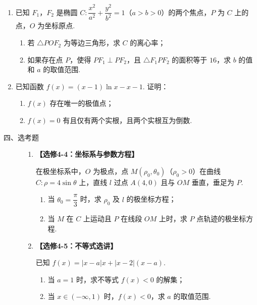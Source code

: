 \begin{description}
\begin{enumerate}[leftmargin=5pt]
附：\(\sqrt{74}\approx 8.602\).

        \item 已知 \(F_1\)，\(F_2\) 是椭圆 \(C:\dfrac{x^2}{a^2}+\dfrac{y^2}{b^2}=1\)（\(a>b>0\)）的两个焦点，\(P\) 为 \(C\) 上的点，\(O\) 为坐标原点.

\begin{enumerate}
\item 若 \(\triangle POF_2\) 为等边三角形，求 \(C\) 的离心率；
\item 如果存在点 \(P\)，使得 \(PF_1\perp PF_2\)，且 \(\triangle F_1PF_2\) 的面积等于 \(16\)，求 \(b\) 的值和 \(a\) 的取值范围.
\end{enumerate}

        \item 已知函数 \(f(x)=(x-1)\ln x-x-1\). 证明：

\begin{enumerate}
\item \(f(x)\) 存在唯一的极值点；
\item \(f(x)=0\) 有且仅有两个实根，且两个实根互为倒数.
\end{enumerate}

    \end{enumerate}

\end{description}

\begin{description}

    \item[四、选考题]

    \begin{enumerate}[leftmargin=5pt]

      \addtocounter{enumi}{+21}

        \item \textbf{【选修4-4：坐标系与参数方程】}

在极坐标系中，\(O\) 为极点，点 \(M(\rho_0,\theta_0)\)（\(\rho_0>0\)）在曲线 \(C:\rho=4\sin\theta\) 上，直线 \(l\) 过点 \(A(4,0)\) 且与 \(OM\) 垂直，垂足为 \(P\).

\begin{enumerate}
\item 当 \(\theta_0=\dfrac{\pi}{3}\) 时，求 \(\rho_0\) 及 \(l\) 的极坐标方程；
\item 当 \(M\) 在 \(C\) 上运动且 \(P\) 在线段 \(OM\) 上时，求 \(P\) 点轨迹的极坐标方程.
\end{enumerate}

        \item \textbf{【选修4-5：不等式选讲】}

已知 \(f(x)=|x-a|x+|x-2|(x-a)\).

\begin{enumerate}
\item 当 \(a=1\) 时，求不等式 \(f(x)<0\) 的解集；
\item 当 \(x\in(-\infty,1)\) 时，\(f(x)<0\)，求 \(a\) 的取值范围.
\end{enumerate}

    \end{enumerate}

\end{description}


